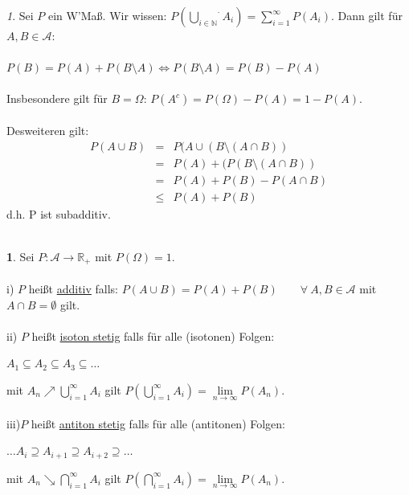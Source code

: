 \documentclass[10pt,a4paper]{report}
\numberwithin{equation}{section}
\numberwithin{figure}{section}
\theoremstyle{plain}
\theoremstyle{definition}
\newtheorem{defn}{\protect\definitionname}[section]
\theoremstyle{plain}
\theoremstyle{definition}
\theoremstyle{remark}
\newtheorem{rem}{\protect\remarkname}[section]
\theoremstyle{plain}
\theoremstyle{plain}
\theoremstyle{plain}
\theoremstyle{plain}
\theoremstyle{plain}
\providecommand{\definitionname}{Definition}
\providecommand{\remarkname}{Bemerkung}
\newcommand{\1}{ \mathbb{1} } %
\begin{document}
\begin{rem}
  Sei $P$ ein W'Maß. Wir wissen: $P\left(\stackrel{\cdot}{\bigcup\limits_{i \in \mathbb{N}}}A_i\right)=\sum\limits_{i=1}^\infty P(A_i)$. Dann gilt für $A,B \in \mathcal{A}$:\\\\
  $P(B)=P(A)+P(B\setminus A) \Leftrightarrow P(B\setminus A)=P(B)-P(A)$\\\\
  Insbesondere gilt für $B=\Omega$: $P(A^c)=P(\Omega)-P(A)=1-P(A)$.\\\\
  Desweiteren gilt:
  \begin{eqnarray*}
    P(A\cup B)&=&P(A\cup(B\setminus (A\cap B))\\
    &=&P(A)+(P(B\setminus(A \cap B))\\
    &=& P(A)+P(B)-P(A\cap B)\\ 
    &\leq& P(A)+P(B)
  \end{eqnarray*}
  d.h. P ist subadditiv.\\\\
\end{rem}
\begin{defn}
  Sei $P:\mathcal{A} \to \mathbb{R}_+$ mit $P(\Omega)=1$.\\\\
  i) $P$ heißt \underline{additiv} falls: $P(A\cup B)=P(A)+P(B) \qquad \forall~ A,B\in\mathcal{A} $ mit $A\cap B =\emptyset$ gilt. \\\\
  ii) $P$ heißt \underline{isoton stetig} falls für alle (isotonen)
  Folgen:
  \begin{center}
    $A_1 \subseteq A_2 \subseteq A_3 \subseteq \dots$
  \end{center}
  mit $A_n \nearrow \bigcup\limits_{i=1}^\infty A_i$ gilt $P\left(\bigcup\limits_{i=1}^\infty A_i\right)=\lim\limits_{n \to \infty}P(A_n)$.\\\\
  iii)$P$ heißt \underline{antiton stetig} falls für alle (antitonen)
  Folgen:
  \begin{center}
    $\dots A_i \supseteq A_{i+1} \supseteq A_{i+2} \supseteq \dots$
  \end{center}
  mit $A_n \searrow \bigcap\limits_{i=1}^\infty A_i$ gilt $P\left(\bigcap\limits_{i=1}^\infty A_i\right)=\lim\limits_{n \to \infty}P(A_n)$.\\\\\\
\end{defn}
\end{document}
